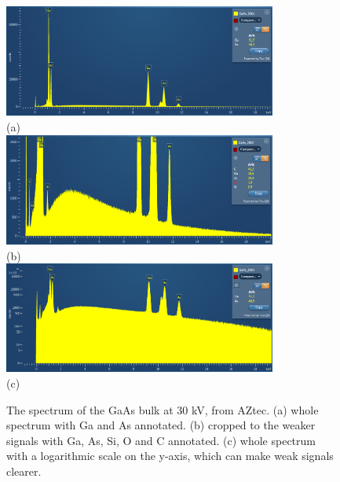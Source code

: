 \begin{figure}[p]
    \centering
    \includegraphics[width=0.8\textwidth]{figures/GaAs_30kV_SEM_lin.PNG}
    \\[1em]
    (a)
    \\[1em]
    \includegraphics[width=0.8\textwidth]{figures/GaAs_30kV_SEM_lin_scaled.PNG}
    \\[1em]
    (b)
    \\[1em]
    \includegraphics[width=0.8\textwidth]{figures/GaAs_30kV_SEM_log.PNG}
    \\[1em]
    (c)
    \caption{
        The spectrum of the GaAs bulk at 30 kV, from AZtec.
        (a) whole spectrum with Ga and As annotated.
        (b) cropped to the weaker signals with Ga, As, Si, O and C annotated.
        (c) whole spectrum with a logarithmic scale on the y-axis, which can make weak signals clearer.
    }
    \label{fig:GaAs30kV_AZ}
\end{figure}


